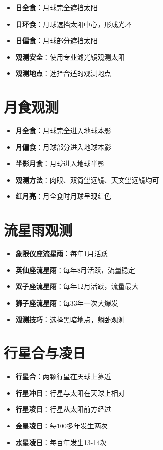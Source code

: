 \documentclass[12pt,UTF8]{ctexbook}
\begin{document}
\begin{itemize}
  \item \textbf{日全食}：月球完全遮挡太阳
  \item \textbf{日环食}：月球遮挡太阳中心，形成光环
  \item \textbf{日偏食}：月球部分遮挡太阳
  \item \textbf{观测安全}：使用专业滤光镜观测太阳
  \item \textbf{观测地点}：选择合适的观测地点
\end{itemize}

\section{月食观测}

\begin{itemize}
  \item \textbf{月全食}：月球完全进入地球本影
  \item \textbf{月偏食}：月球部分进入地球本影
  \item \textbf{半影月食}：月球进入地球半影
  \item \textbf{观测方法}：肉眼、双筒望远镜、天文望远镜均可
  \item \textbf{红月亮}：月全食时月球呈现红色
\end{itemize}

\section{流星雨观测}

\begin{itemize}
  \item \textbf{象限仪座流星雨}：每年1月活跃
  \item \textbf{英仙座流星雨}：每年8月活跃，流量稳定
  \item \textbf{双子座流星雨}：每年12月活跃，流量最大
  \item \textbf{狮子座流星雨}：每33年一次大爆发
  \item \textbf{观测技巧}：选择黑暗地点，躺卧观测
\end{itemize}

\section{行星合与凌日}

\begin{itemize}
  \item \textbf{行星合}：两颗行星在天球上靠近
  \item \textbf{行星冲日}：行星与太阳在天球上相对
  \item \textbf{行星凌日}：行星从太阳前方经过
  \item \textbf{金星凌日}：每100多年发生两次
  \item \textbf{水星凌日}：每百年发生13-14次
\end{itemize}
\end{document}

